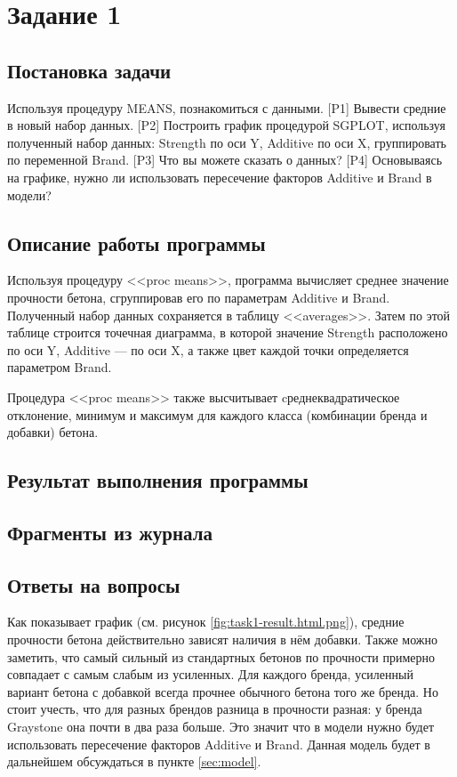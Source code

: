 \documentclass[12pt,a4paper]{article}
\begin{document}

  \section{Задание 1}
  \subsection{Постановка задачи}
  \label{sec:1.1}
  Используя процедуру MEANS, познакомиться с данными.
  [P1] Вывести средние в новый набор данных.
  [P2] Построить график процедурой SGPLOT, используя полученный набор данных:
       Strength по оси Y, Additive по оси X, группировать по переменной Brand.
  [P3] Что вы можете сказать о данных?
  [P4] Основываясь на графике, нужно ли использовать пересечение факторов Additive и Brand в модели?

  \subsection{Описание работы программы}
  Используя процедуру <<proc means>>, программа вычисляет среднее значение прочности бетона,
  сгруппировав его по параметрам Additive и Brand.
  Полученный набор данных сохраняется в таблицу <<averages>>.
  Затем по этой таблице строится точечная диаграмма,
  в которой значение Strength расположено по оси Y, Additive --- по оси X, а также цвет каждой точки определяется параметром Brand.

  Процедура <<proc means>> также высчитывает cреднеквадратическое отклонение, минимум и максимум
  для каждого класса (комбинации бренда и добавки) бетона.

  \subsection{Результат выполнения программы}

  \subsection{Фрагменты из журнала}

  \subsection{Ответы на вопросы}
  \label{sec:describe}
  Как показывает график (см. рисунок \ref{fig:task1-result.html.png}),
  средние прочности бетона действительно зависят наличия в нём добавки.
  Также можно заметить, что самый сильный из стандартных бетонов по прочности примерно совпадает с самым слабым из усиленных.
  Для каждого бренда, усиленный вариант бетона с добавкой всегда прочнее обычного бетона того же бренда.
  Но стоит учесть, что для разных брендов разница в прочности разная:
  у бренда Graystone она почти в два раза больше.
  Это значит что в модели нужно будет использовать пересечение факторов Additive и Brand.
  Данная модель будет в дальнейшем обсуждаться в пункте \ref{sec:model}.
\end{document}
